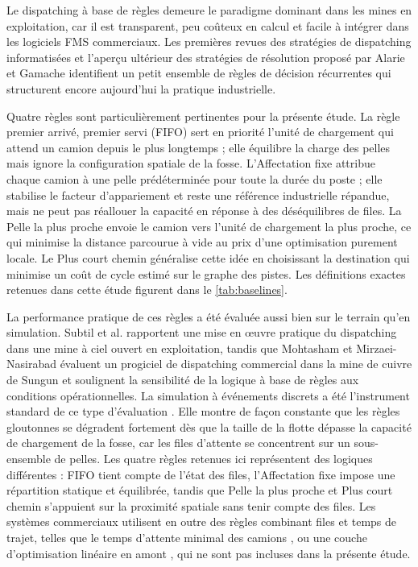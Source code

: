 \documentclass[11pt,a4paper]{article}
\newif\ifrevmarks
\newcommand{\revtag}[1]{\ifrevmarks\textsuperscript{\textcolor{red!70!black}{\scriptsize[#1]}}\fi}
\newcommand{\rev}[2]{\ifrevmarks{\color{revcolor}#2}\revtag{#1}\else#2\fi}
\newenvironment{revbloc}[1]{\par\ifrevmarks\color{revcolor}\noindent\revtag{#1}\ \fi}{\par}
\begin{document}
Le dispatching à base de règles demeure le paradigme dominant dans les mines en exploitation, car il est transparent, peu coûteux en calcul et facile à intégrer dans les logiciels FMS commerciaux. Les premières revues des stratégies de dispatching informatisées \cite{MohanMunirathinam1994} et l'aperçu ultérieur des stratégies de résolution proposé par Alarie et Gamache \cite{Alarie2002} identifient un petit ensemble de règles de décision récurrentes qui structurent encore aujourd'hui la pratique industrielle.

\begin{revbloc}{M25, Dir. corr. 1}
Quatre règles sont particulièrement pertinentes pour la présente étude. La règle premier arrivé, premier servi (FIFO) sert en priorité l'unité de chargement qui attend un camion depuis le plus longtemps ; elle équilibre la charge des pelles mais ignore la configuration spatiale de la fosse. L'Affectation fixe attribue chaque camion à une pelle prédéterminée pour toute la durée du poste ; elle stabilise le facteur d'appariement et reste une référence industrielle répandue, mais ne peut pas réallouer la capacité en réponse à des déséquilibres de files. La Pelle la plus proche envoie le camion vers l'unité de chargement la plus proche, ce qui minimise la distance parcourue à vide au prix d'une optimisation purement locale. Le Plus court chemin généralise cette idée en choisissant la destination qui minimise un coût de cycle estimé sur le graphe des pistes. Les définitions exactes retenues dans cette étude figurent dans le \cref{tab:baselines}.
\end{revbloc}

La performance pratique de ces règles a été évaluée aussi bien sur le terrain qu'en simulation. Subtil et al. \cite{Subtil2011} rapportent une mise en œuvre pratique du dispatching dans une mine à ciel ouvert en exploitation, tandis que Mohtasham et Mirzaei-Nasirabad \cite{MehrnazMohtasham2023} évaluent un progiciel de dispatching commercial dans la mine de cuivre de Sungun et soulignent la sensibilité de la logique à base de règles aux conditions opérationnelles. La simulation à événements discrets a été l'instrument standard de ce type d'évaluation \cite{NecmettinCetin2004, MarceloFioroni2008, Zeng2022, MiladAbolghasemian2020}. Elle montre de façon constante que les règles gloutonnes se dégradent fortement dès que la taille de la flotte dépasse la capacité de chargement de la fosse, car les files d'attente se concentrent sur un sous-ensemble de pelles. \rev{M25, m5}{Les quatre règles retenues ici représentent des logiques différentes : FIFO tient compte de l'état des files, l'Affectation fixe impose une répartition statique et équilibrée, tandis que Pelle la plus proche et Plus court chemin s'appuient sur la proximité spatiale sans tenir compte des files. Les systèmes commerciaux utilisent en outre des règles combinant files et temps de trajet, telles que le temps d'attente minimal des camions \cite{Zeng2022}, ou une couche d'optimisation linéaire en amont \cite{Soumis1989, AmandaSmith2020}, qui ne sont pas incluses dans la présente étude.}
\end{document}
